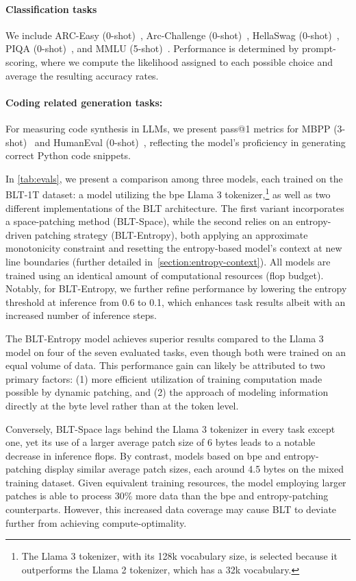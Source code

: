 \paragraph{Classification tasks} We include ARC-Easy (0-shot)~\citep{Eval_ARC}, Arc-Challenge (0-shot)~\citep{Eval_ARC}, HellaSwag (0-shot)~\citep{Eval_hellaswag}, PIQA (0-shot)~\citep{Eval_piqa}, and MMLU (5-shot)~\citep{hendrycks2020measuring}. Performance is determined by prompt-scoring, where we compute the likelihood assigned to each possible choice and average the resulting accuracy rates.
\paragraph{Coding related generation tasks:} For measuring code synthesis in LLMs, we present pass@1 metrics for MBPP (3-shot)~\citep{Eval_MBPP} and HumanEval (0-shot)~\citep{Eval_HumanEval}, reflecting the model's proficiency in generating correct Python code snippets.

In \autoref{tab:evals}, we present a comparison among three models, each trained on the {\textsc BLT}-1T dataset: a model utilizing the bpe Llama 3 tokenizer,\footnote{The Llama 3 tokenizer, with its 128k vocabulary size, is selected because it outperforms the Llama 2 tokenizer, which has a 32k vocabulary.} as well as two different implementations of the {\textsc BLT} architecture. The first variant incorporates a space-patching method ({\textsc BLT}-Space), while the second relies on an entropy-driven patching strategy ({\textsc BLT}-Entropy), both applying an approximate monotonicity constraint and resetting the entropy-based model’s context at new line boundaries (further detailed in~\autoref{section:entropy-context}). All models are trained using an identical amount of computational resources (flop budget). Notably, for {\textsc BLT}-Entropy, we further refine performance by lowering the entropy threshold at inference from 0.6 to 0.1, which enhances task results albeit with an increased number of inference steps.

The {\textsc BLT}-Entropy model achieves superior results compared to the Llama 3 model on four of the seven evaluated tasks, even though both were trained on an equal volume of data. This performance gain can likely be attributed to two primary factors: (1) more efficient utilization of training computation made possible by dynamic patching, and (2) the approach of modeling information directly at the byte level rather than at the token level.

Conversely, {\textsc BLT}-Space lags behind the Llama 3 tokenizer in every task except one, yet its use of a larger average patch size of 6 bytes leads to a notable decrease in inference flops. By contrast, models based on bpe and entropy-patching display similar average patch sizes, each around 4.5 bytes on the mixed training dataset. Given equivalent training resources, the model employing larger patches is able to process 30\% more data than the bpe and entropy-patching counterparts. However, this increased data coverage may cause {\textsc BLT} to deviate further from achieving compute-optimality.

